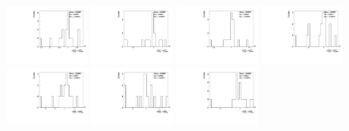 \begin{figure}[h]\centering
    \includegraphics[width=0.24\textwidth]{figure/polarimetery/syst/model/output_model_4600_alpha0.pdf}
    \includegraphics[width=0.24\textwidth]{figure/polarimetery/syst/model/output_model_4612_alpha0.pdf}
    \includegraphics[width=0.24\textwidth]{figure/polarimetery/syst/model/output_model_4626_alpha0.pdf}
    \includegraphics[width=0.24\textwidth]{figure/polarimetery/syst/model/output_model_4640_alpha0.pdf}
    \includegraphics[width=0.24\textwidth]{figure/polarimetery/syst/model/output_model_4660_alpha0.pdf}
    \includegraphics[width=0.24\textwidth]{figure/polarimetery/syst/model/output_model_4680_alpha0.pdf}
    \includegraphics[width=0.24\textwidth]{figure/polarimetery/syst/model/output_model_4700_alpha0.pdf}

\end{figure}
